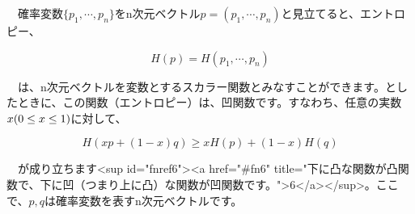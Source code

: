 　確率変数$\{ p_1, \cdots , p_n \}$をn次元ベクトル$p = (p_1, \cdots , p_n)$と見立てると、エントロピー、　

 \begin{equation}H(p) = H(p_1, \cdots , p_n) \tag{11}
 \end{equation}

　は、n次元ベクトルを変数とするスカラー関数とみなすことができます。としたときに、この関数（エントロピー）は、凹関数です。すなわち、任意の実数$x \space (0 \leq x \leq 1)$に対して、　

 \begin{equation}H(xp + (1-x)q) \geq x H(p) + (1-x) H(q)  \tag{12}
 \end{equation}

　が成り立ちます<sup id="fnref6"><a href="#fn6" title="下に凸な関数が凸関数で、下に凹（つまり上に凸）な関数が凹関数です。">6</a></sup>。ここで、$p,q$は確率変数を表すn次元ベクトルです。　
